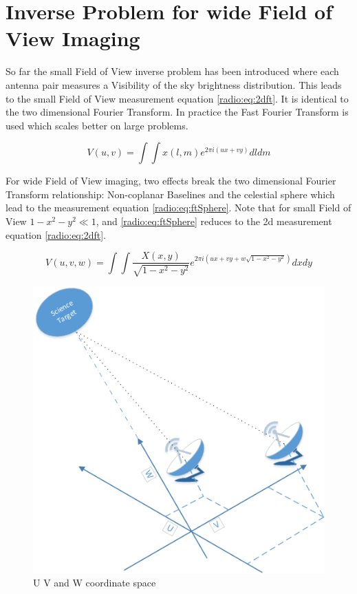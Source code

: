 \section{Inverse Problem for wide Field of View Imaging} \label{radio}
So far the small Field of View inverse problem has been introduced where each antenna pair measures a Visibility of the sky brightness distribution. This leads to the small Field of View measurement equation \eqref{radio:eq:2dft}. It is identical to the two dimensional Fourier Transform. In practice the Fast Fourier Transform is used which scales better on large problems.

\begin{equation}\label{radio:eq:2dft}
V(u, v) = \int\int x(l, m) e^{2 \pi i (ux+vy)} dl dm
\end{equation}

For wide Field of View imaging, two effects break the two dimensional Fourier Transform relationship: Non-coplanar Baselines and the celestial sphere which lead to the measurement equation \eqref{radio:eq:ftSphere}. Note that for small Field of View $1 - x^2 -y ^2 \ll 1$, and \eqref{radio:eq:ftSphere} reduces to the 2d measurement equation \eqref{radio:eq:2dft}. 

\begin{equation}\label{radio:eq:ftSphere}
	V(u, v, w) = \int\int \frac{X(x, y)}{\sqrt{1 - x^2 - y ^2}} e^{2 \pi i (ux+vy+ w\sqrt{1 - x^2 - y ^2})}dx dy
\end{equation}

\begin{figure}
	\centering
	\includegraphics[width=0.9\linewidth]{./chapters/03.radio/uvw.png}
	\caption{U V and W coordinate space}
	\label{radio:uvw}
	\vspace{-10pt}
\end{figure}

